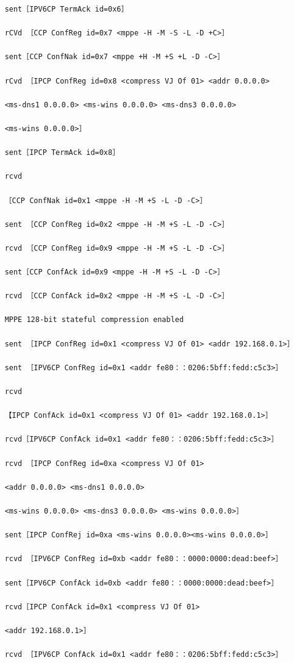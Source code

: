 \begin{verbatim}
    sent［IPV6CP TermAck id=0x6］
    
    rCVd ［CCP ConfReg id=0x7 <mppe -H -M -S -L -D +C>］
    
    sent［CCP ConfNak id=0x7 <mppe +H -M +S +L -D -C>］
    
    rCvd ［IPCP ConfReg id=0x8 <compress VJ Of 01> <addr 0.0.0.0>
    
    <ms-dns1 0.0.0.0> <ms-wins 0.0.0.0> <ms-dns3 0.0.0.0>
    
    <ms-wins 0.0.0.0>］
    
    sent［IPCP TermAck id=0x8］
    
    rcvd
    
    ［CCP ConfNak id=0x1 <mppe -H -M +S -L -D -C>］
    
    sent ［CCP ConfReg id=0x2 <mppe -H -M +S -L -D -C>］
    
    rcvd ［CCP ConfReg id=0x9 <mppe -H -M +S -L -D -C>］
    
    sent［CCP ConfAck id=0x9 <mppe -H -M +S -L -D -C>］
    
    rcvd ［CCP ConfAck id=0x2 <mppe -H -M +S -L -D -C>］
    
    MPPE 128-bit stateful compression enabled
    
    sent ［IPCP ConfReg id=0x1 <compress VJ Of 01> <addr 192.168.0.1>］
    
    sent ［IPV6CP ConfReg id=0x1 <addr fe80：：0206:5bff:fedd:c5c3>］
    
    rcvd
    
    【IPCP ConfAck id=0x1 <compress VJ Of 01> <addr 192.168.0.1>］
    
    rcvd［IPV6CP ConfAck id=0x1 <addr fe80：：0206:5bff:fedd:c5c3>］
    
    rcvd ［IPCP ConfReg id=0xa <compress VJ Of 01>
    
    <addr 0.0.0.0> <ms-dns1 0.0.0.0>
    
    <ms-wins 0.0.0.0> <ms-dns3 0.0.0.0> <ms-wins 0.0.0.0>］
    
    sent［IPCP ConfRej id=0xa <ms-wins 0.0.0.0><ms-wins 0.0.0.0>］
    
    rcvd ［IPV6CP ConfReg id=0xb <addr fe80：：0000:0000:dead:beef>］
    
    sent［IPV6CP ConfAck id=0xb <addr fe80：：0000:0000:dead:beef>］
    
    rcvd［IPCP ConfAck id=0x1 <compress VJ Of 01>
    
    <addr 192.168.0.1>］
    
    rcvd ［IPV6CP ConfAck id=0x1 <addr fe80：：0206:5bff:fedd:c5c3>］
    

\end{verbatim}
